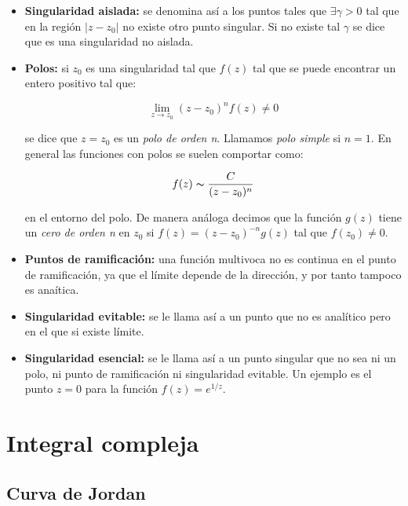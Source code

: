 \documentclass[12pt]{book}
\begin{document}
\begin{itemize}
\item \textbf{Singularidad aislada:} se denomina así a los puntos tales que $\exists \gamma >0 $ tal que en la región $|z-z_0|$ no existe otro punto singular. Si no existe tal $\gamma$ se dice que es una singularidad no aislada.

\item \textbf{Polos:} si $z_0$ es una singularidad tal que $f(z)$ tal que se puede encontrar un entero positivo tal que:

\begin{equation}
\lim_{z \rightarrow z_0} (z-z_0)^n f(z) \neq 0
\end{equation}

se dice que $z=z_0$ es un \textit{polo de orden n}. Llamamos \textit{polo simple} si $n=1$. En general las funciones con polos se suelen comportar como:

\begin{equation}
f(z) \thicksim \frac{C}{(z-z_0)^n}
\end{equation}


en el entorno del polo. De manera análoga decimos que la función $g(z)$ tiene un \textit{cero de orden n} en $z_0$ si $f(z)=(z-z_0)^{-n} g(z)$ tal que $f(z_0) \neq  0$. 

\item \textbf{Puntos de ramificación:} una función multivoca no es continua en el punto de ramificación, ya que el límite depende de la dirección, y por tanto tampoco es anaítica.

\item \textbf{Singularidad evitable:} se le llama así a un punto que no es analítico pero en el que si existe límite.

\item \textbf{Singularidad esencial:} se le llama  así a un punto singular que no sea ni un polo, ni punto de ramificación ni singularidad evitable. Un ejemplo es el punto $z=0$ para la función $f(z)=e^{1/z}$.
\end{itemize}

\chapter{Integral compleja}

\section{Curva de Jordan}
\end{document}
